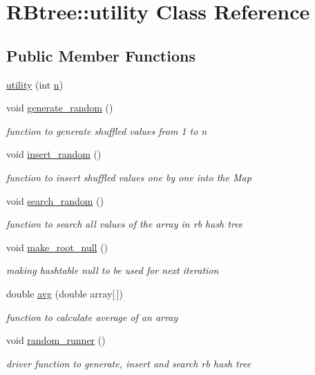 \hypertarget{class_r_btree_1_1utility}{\section{R\-Btree\-:\-:utility Class Reference}
\label{class_r_btree_1_1utility}
}
\subsection*{Public Member Functions}
\begin{DoxyCompactItemize}
\item 
\hyperlink{class_r_btree_1_1utility_a01e57205438731952286a5bfd2747291}{utility} (int \hyperlink{class_r_btree_1_1utility_a5f8d03fdb96145436e2b44275f49b3ab}{n})
\item 
void \hyperlink{class_r_btree_1_1utility_abb88fd9d01ba0e0e91518351c426b06b}{generate\-\_\-random} ()
\begin{DoxyCompactList}\small\item\em function to generate shuffled values from 1 to n \end{DoxyCompactList}\item 
void \hyperlink{class_r_btree_1_1utility_a84ba000fe0da7f22d3a1d0765fa9f585}{insert\-\_\-random} ()
\begin{DoxyCompactList}\small\item\em function to insert shuffled values one by one into the Map \end{DoxyCompactList}\item 
void \hyperlink{class_r_btree_1_1utility_a60f41ab6c0bffdbae8f3a3848f5e469a}{search\-\_\-random} ()
\begin{DoxyCompactList}\small\item\em function to search all values of the array in rb hash tree \end{DoxyCompactList}\item 
void \hyperlink{class_r_btree_1_1utility_af7cfb347351185498a40144d9a399bb7}{make\-\_\-root\-\_\-null} ()
\begin{DoxyCompactList}\small\item\em making hashtable null to be used for next iteration \end{DoxyCompactList}\item 
double \hyperlink{class_r_btree_1_1utility_a58a75091f87f9a01f46371c5eec25622}{avg} (double array\mbox{[}$\,$\mbox{]})
\begin{DoxyCompactList}\small\item\em function to calculate average of an array \end{DoxyCompactList}\item 
void \hyperlink{class_r_btree_1_1utility_ac0c3621f49c287aa0cd9a591236f5e1e}{random\-\_\-runner} ()
\begin{DoxyCompactList}\small\item\em driver function to generate, insert and search rb hash tree \end{DoxyCompactList}\end{DoxyCompactItemize}
